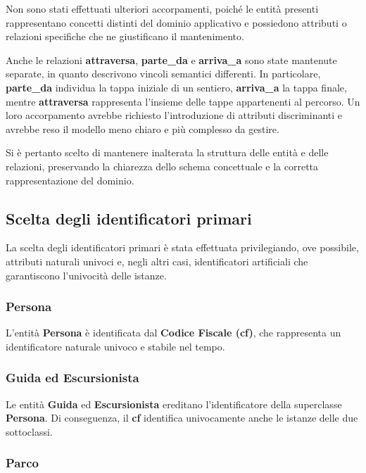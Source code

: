 \documentclass[10pt, a4paper]{article}
\begin{document}
Non sono stati effettuati ulteriori accorpamenti, poiché le entità presenti rappresentano concetti distinti del dominio applicativo e possiedono attributi o relazioni specifiche che ne giustificano il mantenimento.

Anche le relazioni \textbf{attraversa}, \textbf{parte\_da} e \textbf{arriva\_a} sono state mantenute separate, in quanto descrivono vincoli semantici differenti. In particolare, \textbf{parte\_da} individua la tappa iniziale di un sentiero, \textbf{arriva\_a} la tappa finale, mentre \textbf{attraversa} rappresenta l'insieme delle tappe appartenenti al percorso. Un loro accorpamento avrebbe richiesto l'introduzione di attributi discriminanti e avrebbe reso il modello meno chiaro e più complesso da gestire.

Si è pertanto scelto di mantenere inalterata la struttura delle entità e delle relazioni, preservando la chiarezza dello schema concettuale e la corretta rappresentazione del dominio.



\subsection{Scelta degli identificatori primari}

La scelta degli identificatori primari è stata effettuata privilegiando, ove possibile, attributi naturali univoci e, negli altri casi, identificatori artificiali che garantiscono l'univocità delle istanze.

\subsubsection{Persona}

L'entità \textbf{Persona} è identificata dal \textbf{Codice Fiscale (cf)}, che rappresenta un identificatore naturale univoco e stabile nel tempo.

\subsubsection{Guida ed Escursionista}

Le entità \textbf{Guida} ed \textbf{Escursionista} ereditano l'identificatore della superclasse \textbf{Persona}. Di conseguenza, il \textbf{cf} identifica univocamente anche le istanze delle due sottoclassi.

\subsubsection{Parco}
\end{document}
